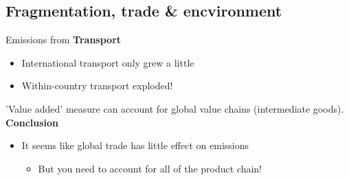 \begin{multicols}{2}\noindent
 \subsection{Fragmentation, trade \& encvironment}\noindent
 Emissions from \textbf{Transport}
 \begin{itemize}
  \item International transport only grew a little
  \item Within-country transport exploded!
 \end{itemize}
 'Value added' measure can account for global value chains (intermediate goods).\\
 \textbf{Conclusion} \\
 \begin{itemize}
  \item It seems like global trade has little effect on emissions
        \begin{itemize}
         \item But you need to account for all of the product chain!
        \end{itemize}
 \end{itemize}

\end{multicols}

